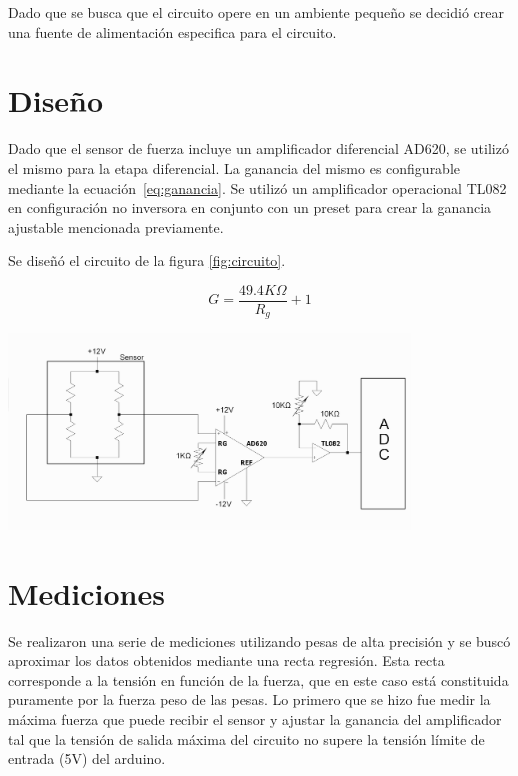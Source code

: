\documentclass[a4paper, 10pt, spanish]{article}
\begin{document}
    Dado que se busca que el circuito opere en un ambiente pequeño se decidió crear una fuente de alimentación especifica para el circuito. %

\section{Diseño}


    Dado que el sensor de fuerza incluye un amplificador diferencial AD620, se utilizó el mismo para la etapa diferencial. La ganancia del mismo es configurable mediante la ecuación~\ref{eq:ganancia}. Se utilizó un amplificador operacional TL082 en configuración no inversora en conjunto con un preset para crear la ganancia ajustable mencionada previamente.

    Se diseñó el circuito de la figura \ref{fig:circuito}.

    \begin{equation}\label{eq:ganancia}
        G = \frac{49.4K\Omega}{R_g} + 1
    \end{equation}

    \begin{center}
      \includegraphics[width=0.8\textwidth]{Circuito.png}
      \label{fig:circuito}
    \end{center}

\newpage

\section{Mediciones}

    Se realizaron una serie de mediciones utilizando pesas de alta precisión y se buscó aproximar los datos obtenidos mediante una recta regresión. Esta recta corresponde a la tensión en función de la fuerza, que en este caso está constituida puramente por la fuerza peso de las pesas. Lo primero que se hizo fue medir la máxima fuerza que puede recibir el sensor y ajustar la ganancia del amplificador tal que la tensión de salida máxima del circuito no supere la tensión límite de entrada (5V) del arduino.
\end{document}
